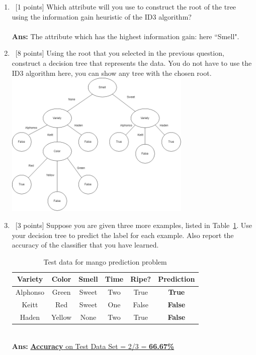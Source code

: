 \documentclass[12pt, fullpage,letterpaper]{article}
\begin{document}
\begin{enumerate}
\begin{enumerate}
\begin{itemize}
    Two - 3/5 False, 2/5 True; Entropy = -3/5 log(3/5) - 2/5log(2/5) = -3/5 * (-0.737) - 2/5 * (-1.322) = 0.971
    One - 1/3 False, 2/3 True; Entropy = -1/3 log(1/3) - 2/3 log(2/3) = 0.918\\
  Expected Entropy = 5/8 * 0.971 + 3/8 * 0.918 = 0.9511\\
    \underline{Gain (Time) = 1 - 0.9511 = 0.0489}\\
    \end{itemize}
  \item~[1 points] Which attribute will you use to construct the root of the tree using the information gain heuristic of the ID3 algorithm? \\\\
 \textbf{Ans: }The attribute which has the highest information gain: here ``Smell".
  \item~[8 points] Using the root that you selected in the previous question, construct a decision tree that represents the data. You do not have to use the ID3 algorithm here, you can show any tree with the chosen root.\\
\includegraphics[width=0.7\textwidth]{ml_q2e_uml.png}
  \item~[3 points] Suppose you are given three more examples, listed in Table~\ref{tb-mango-test}. Use your decision tree to predict the label for each example. Also report the accuracy of the classifier that you have learned.
   \begin{table}[h!]
    \centering
    \begin{tabular}{cccc|c|c}
      \hline
      Variety & Color  & Smell  & Time & Ripe? & \textbf{Prediction}\\ \hline
      Alphonso& Green  & Sweet  & Two  & True  & \textbf{True}\\
      Keitt   & Red    & Sweet  & One  & False & \textbf{False}\\
      Haden   & Yellow & None   & Two  & True  & \textbf{False}\\ \hline
    \end{tabular}
    \caption{Test data for mango prediction problem}\label{tb-mango-test}
  \end{table}
   \\\textbf{Ans: }\underline{\textbf{Accuracy} on Test Data Set = 2/3 = \textbf{66.67\%}}
  \end{enumerate}


\end{enumerate}
\end{document}
